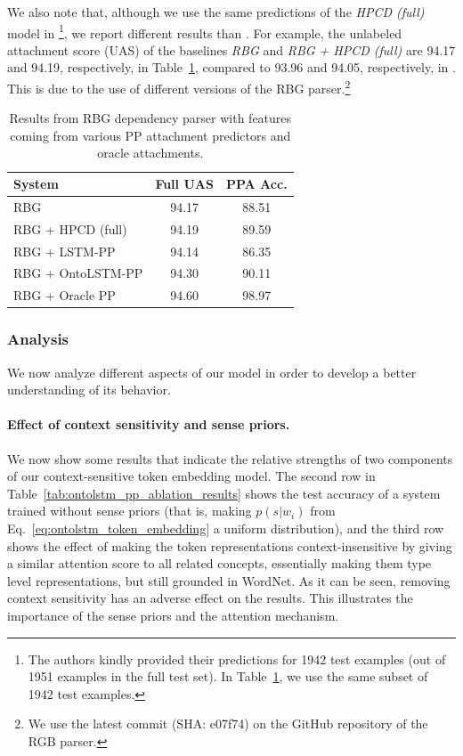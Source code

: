We also note that, although we use the same predictions of the \textit{HPCD (full)} model in  \cite{belinkov2014exploring}\footnote{The authors kindly provided their predictions for 1942 test examples (out of 1951 examples in the full test set). In Table~\ref{tab:ontolstm_parser_ppa_results}, we use the same subset of 1942 test examples.}, we report different results than  \cite{belinkov2014exploring}.
For example, the unlabeled attachment score (UAS) of the baselines \textit{RBG} and \textit{RBG + HPCD (full)} are 94.17 and 94.19, respectively, in Table~\ref{tab:ontolstm_parser_ppa_results}, compared to 93.96 and 94.05, respectively, in \cite{belinkov2014exploring}.
This is due to the use of different versions of the RBG parser.\footnote{We use the latest commit (SHA: e07f74) on the GitHub repository of the RGB parser.}

\begin{table}
    \centering
    \begin{tabular}{lcc}
    \toprule
    \textbf{System} & \textbf{Full UAS} & \textbf{PPA Acc.}\\
    \midrule
    RBG               & 94.17 & 88.51 \\
    RBG + HPCD (full) & 94.19 & 89.59 \\
    RBG + LSTM-PP  & 94.14 & 86.35 \\
    RBG + OntoLSTM-PP & 94.30 & 90.11 \\
    RBG + Oracle PP & 94.60 & 98.97 \\
    \bottomrule
    \end{tabular}
    \caption{Results from RBG dependency parser with features coming from various PP attachment predictors and oracle attachments.}\label{tab:ontolstm_parser_ppa_results}
\end{table}

\subsubsection{Analysis}
\label{sec:ontolstm_pp_analysis}
We now analyze different aspects of our model in order to develop a better understanding of its behavior.

\paragraph{Effect of context sensitivity and sense priors.} We now show some results that indicate the relative strengths of two components of our context-sensitive token embedding model. The second row in Table~\ref{tab:ontolstm_pp_ablation_results} shows the test accuracy of a system trained without sense priors (that is, making $p(s|w_i)$ from Eq.~\ref{eq:ontolstm_token_embedding} a uniform distribution), and the third row shows the effect of making the token representations context-insensitive by giving a similar attention score to all related concepts, essentially making them type level representations, but still grounded in WordNet. As it can be seen, removing context sensitivity has an adverse effect on the results.
This illustrates the importance of the sense priors and the attention mechanism.

